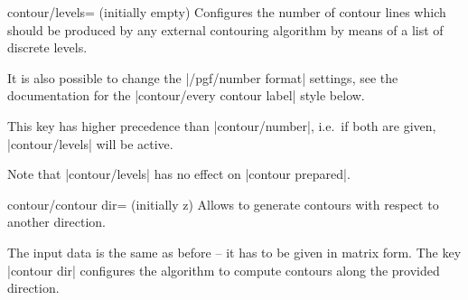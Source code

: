 {{\begin{pgfplotskey}{contour/levels= (initially empty)}
	Configures the number of contour lines which should be produced by any external contouring algorithm by means of a list of discrete levels.
\pgfplotsexpensiveexample
\begin{codeexample}[]
\end{codeexample}
	It is also possible to change the |/pgf/number format| settings, see the documentation for the |contour/every contour label| style below.

	This key has higher precedence than |contour/number|, i.e.\ if both are given, |contour/levels| will be active.

	Note that |contour/levels| has no effect on |contour prepared|.
\end{pgfplotskey}

\begin{pgfplotskey}{contour/contour dir= (initially z)}
%
	Allows to generate contours with respect to another direction.
\pgfplotsexpensiveexample
\begin{codeexample}[]
\end{codeexample}
	
	The input data is the same as before -- it has to be given in matrix form. The key |contour dir| configures the algorithm to compute contours along the provided direction.

\pgfplotsexpensiveexample
\begin{codeexample}[]
\end{codeexample}


\end{pgfplotskey}}}
